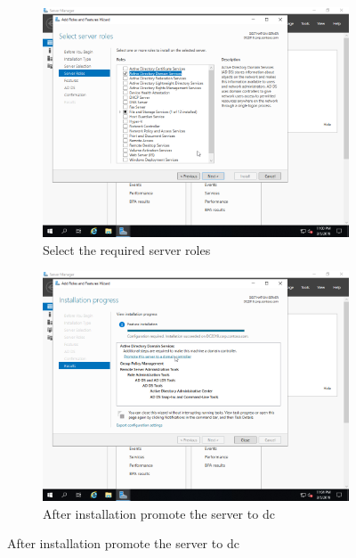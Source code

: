 \begin{figure}[!htb]\ContinuedFloat
	\begin{subfigure}{0.5\textwidth}
		\captionsetup{width=0.8\linewidth}
		\includegraphics[width=0.9\linewidth]{img/Methodologie/Migration17.png}
		\centering
		\caption{Select the required server roles}
	\end{subfigure}
	\begin{subfigure}{0.5\textwidth}
		\captionsetup{width=0.8\linewidth}
		\includegraphics[width=0.9\linewidth]{img/Methodologie/Migration18.png} 
		\centering
		\caption{After installation promote the server to \acrshort{dc}}
	\end{subfigure}
\end{figure}
